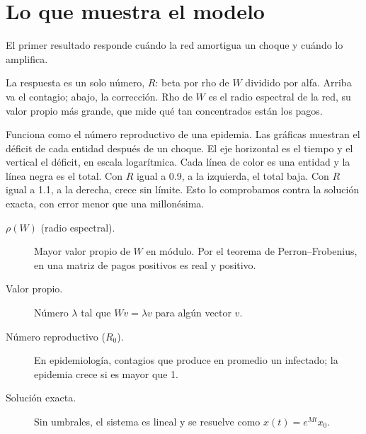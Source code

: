 \section{Lo que muestra el modelo}

\begin{decir}
El primer resultado responde cuándo la red amortigua un choque y cuándo lo amplifica.

La respuesta es un solo número, $R$: beta por rho de $W$ dividido por alfa. Arriba va el
contagio; abajo, la corrección. Rho de $W$ es el radio espectral de la red, su valor
propio más grande, que mide qué tan concentrados están los pagos.

Funciona como el número reproductivo de una epidemia. Las gráficas muestran el déficit
de cada entidad después de un choque. El eje horizontal es el tiempo y el vertical el
déficit, en escala logarítmica. Cada línea de color es una entidad y la línea negra es
el total. Con $R$ igual a 0.9, a
la izquierda, el total baja. Con $R$ igual a 1.1, a la derecha, crece sin límite. Esto
lo comprobamos contra la solución exacta, con error menor que una millonésima.
\end{decir}
\begin{terminos}
\begin{description}
\item[$\rho(W)$ (radio espectral).] Mayor valor propio de $W$ en módulo. Por el teorema de
Perron–Frobenius, en una matriz de pagos positivos es real y positivo.
\item[Valor propio.] Número $\lambda$ tal que $Wv=\lambda v$ para algún vector $v$.
\item[Número reproductivo ($R_0$).] En epidemiología, contagios que produce en promedio
un infectado; la epidemia crece si es mayor que 1.
\item[Solución exacta.] Sin umbrales, el sistema es lineal y se resuelve como
$x(t)=e^{Mt}x_0$.
\end{description}
\end{terminos}

